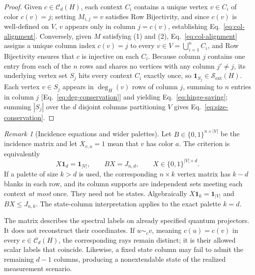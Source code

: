 \documentclass[aps,pra,reprint,superscriptaddress,longbibliography,nofootinbib,floatfix,10pt]{revtex4-2}
\theoremstyle{definition}\newtheorem{definition}[theorem]{Definition}
\theoremstyle{remark}\newtheorem{remark}[theorem]{Remark}
\newcommand{\Sc}{\mathcal S}\newcommand{\Cc}{\mathcal C}
\begin{document}
\begin{proof}
Given $c\in\Cc_d(H)$, each context $C_i$ contains a unique vertex $v\in C_i$ of color $c(v)=j$; setting $M_{i,j}=v$ satisfies Row Bijectivity, and since $c(v)$ is well-defined on $V$, $v$ appears only in column $j=c(v)$, establishing Eq.~\eqref{eq:col-alignment}. Conversely, given $M$ satisfying (1) and (2), Eq.~\eqref{eq:col-alignment} assigns a unique column index $c(v)=j$ to every $v\in V=\bigcup_{i=1}^n C_i$, and Row Bijectivity ensures that $c$ is injective on each $C_i$. Because column $j$ contains one entry from each of the $n$ rows and shares no vertices with any column $j'\neq j$, its underlying vertex set $S_j$ hits every context $C_i$ exactly once, so $\mathbf{1}_{S_j}\in\Sc_{\mathrm{ext}}(H)$. Each vertex $v\in S_j$ appears in $\deg_H(v)$ rows of column $j$, summing to $n$ entries in column $j$ [Eq.~\eqref{eq:deg-conservation}] and yielding Eq.~\eqref{eq:hinge-saving}; summing $|S_j|$ over the $d$ disjoint columns partitioning $V$ gives Eq.~\eqref{eq:size-conservation}.
\end{proof}

\begin{remark}[Incidence equations and wider palettes]\label{rem:wider-palette}
Let $B\in\{0,1\}^{n\times |V|}$ be the incidence matrix and let $X_{v,a}=1$ mean that $v$ has color $a$. The criterion is equivalently
\begin{equation}\label{eq:incidence-factorization}
X\mathbf1_d=\mathbf1_{|V|},\qquad BX=J_{n,d},\qquad X\in\{0,1\}^{|V|\times d}.
\end{equation}
If a palette of size $k>d$ is used, the corresponding $n\times k$ vertex matrix has $k-d$ blanks in each row, and its column supports are independent sets meeting each context \emph{at most} once. They need not be states. Algebraically $X\mathbf1_k=\mathbf1_{|V|}$ and $BX\le J_{n,k}$. The state-column interpretation applies to the exact palette $k=d$.
\end{remark}


The matrix describes the spectral labels on already specified quantum projectors. It does not reconstruct their coordinates. If $u\sim_c v$, meaning $c(u)=c(v)$ in every $c\in\Cc_d(H)$, the corresponding rays remain distinct; it is their allowed scalar labels that coincide. Likewise, a fixed state column may fail to admit the remaining $d-1$ columns, producing a nonextendable state of the realized measurement scenario.
\end{document}

